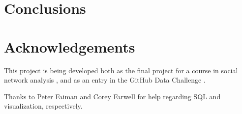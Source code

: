 \documentclass[11pt]{article}
\begin{document}
\section{Conclusions}

\section{Acknowledgements}
This project is being developed both as the final project for a course in social
network analysis \cite{snacourse}, and as an entry in the GitHub Data Challenge
\cite{doll13}.

Thanks to Peter Faiman and Corey Farwell for help regarding SQL and
visualization, respectively.

{\small


}
\end{document}
